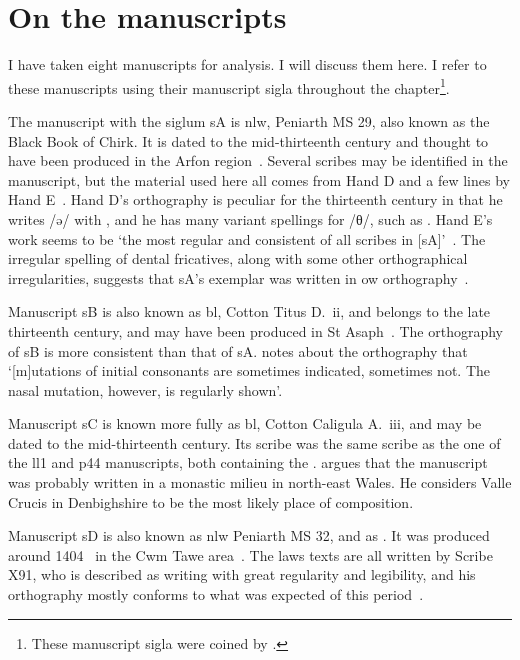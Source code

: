 \section{On the manuscripts}
\label{sec:manuscripts}
I have taken eight manuscripts for analysis. I will discuss them here. I refer to these manuscripts using their manuscript sigla throughout the chapter\footnote{These manuscript sigla were coined by \textcite{owen_ancient_1841}.}.

The manuscript with the siglum \gls{sA} is  \gls{nlw}, Peniarth MS 29, also known as the Black Book of Chirk. It is dated to the mid-thirteenth century and thought to have been produced in the Arfon region~\autocite[171]{russell_scribal_1995}.  Several scribes may be identified in the manuscript, but the material used here all comes from Hand D and a few lines by Hand E~\autocite[133--134]{russell_scribal_1995}. Hand D's orthography is peculiar for the thirteenth century in that he writes /ə/ with , and he has many variant spellings for /θ/, such as . Hand E's work seems to be `the most regular and consistent of all scribes in [\gls{sA}]'~\autocite[152]{russell_scribal_1995}. The irregular spelling of dental fricatives, along with some other orthographical irregularities, suggests that \gls{sA}'s exemplar was written in \gls{ow} orthography~\autocite[169]{russell_scribal_1995}. 

Manuscript \gls{sB} is also known as \gls{bl}, Cotton Titus D.~ii, and belongs to the late thirteenth century, and may have been produced in St Asaph~\autocite[v]{elias_golygiad_2007}. The orthography of \gls{sB} is more consistent than that of \gls{sA}. \Textcite[xlii]{wiliam_llyfr_1960} notes about the orthography that `[m]utations of initial consonants are sometimes indicated, sometimes not. The nasal mutation, however, is regularly shown'.

Manuscript \gls{sC} is known more fully as \gls{bl}, Cotton Caligula A.~iii, and may be dated to the mid-thirteenth century. Its scribe was the same scribe as the one of the \gls{ll1} and \gls{p44} manuscripts, both containing the . \Textcite[189]{huws_medieval_2000} argues that the manuscript was probably written in a monastic milieu in north-east Wales. He considers Valle Crucis in Denbighshire to be the most likely place of composition.

Manuscript \gls{sD} is also known as \gls{nlw} Peniarth MS 32, and as . It was produced around 1404~\autocite[60]{huws_medieval_2000} in the Cwm Tawe area~\autocite[v]{elias_golygiad_2007}. The laws texts are all written by Scribe X91, who is described as writing with great regularity and legibility, and his orthography mostly conforms to what was expected of this period~\autocite{thomas_tei_???}.

